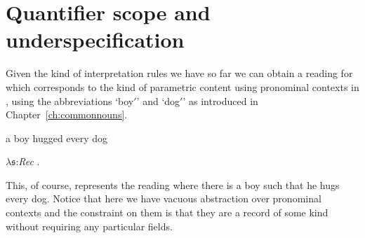 \section{Quantifier scope and underspecification}

Given the kind of interpretation rules we have so far we can obtain a
reading for  which corresponds to the kind of parametric
content using pronominal contexts
in , using the abbreviations `boy$'$' and `dog$'$' as
introduced in Chapter~\ref{ch:commonnouns}.
\begin{ex} 
\begin{subex} 
 
\item a boy hugged every dog 
 
\item $\lambda \mathfrak{s}$:\textit{Rec} . 
 
\end{subex} 
   
\end{ex} 
This, of course, represents the reading where there is a boy such that
he hugs every dog.  Notice that here we have vacuous abstraction over
pronominal contexts and the constraint on them is that they are a record of
some kind without requiring any particular fields.    

